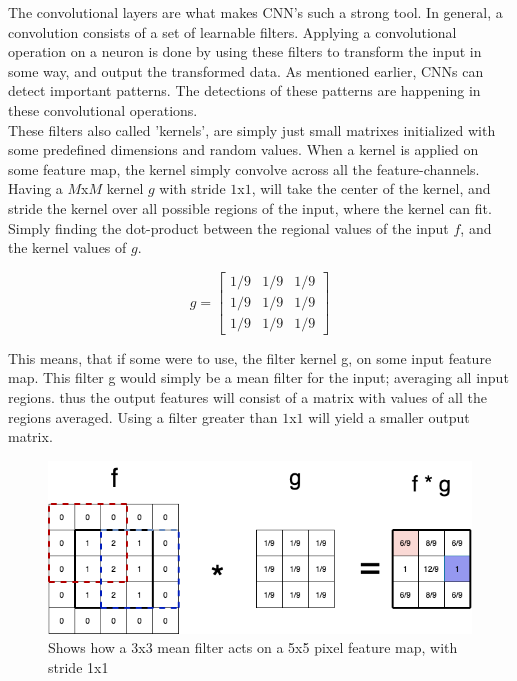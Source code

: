The convolutional layers are what makes CNN's such a strong tool. In general, a convolution consists of a set of learnable filters. Applying a convolutional operation on a neuron is done by using these filters to transform the input in some way, and output the transformed data. As mentioned earlier, CNNs can detect important patterns. The detections of these patterns are happening in these convolutional operations.\\

\noindent
These filters also called 'kernels', are simply just small matrixes initialized with some predefined dimensions and random values. When a kernel is applied on some feature map, the kernel simply convolve across all the feature-channels.\\

\noindent
Having a $M$x$M$ kernel $g$ with stride $1$x$1$, will take the center of the kernel, and stride the kernel over all possible regions of the input, where the kernel can fit. Simply finding the dot-product between the regional values of the input $f$, and the kernel values of $g$.

$$ g = \begin{bmatrix}
1/9 & 1/9 & 1/9 \\
1/9 & 1/9 & 1/9 \\
1/9 & 1/9 & 1/9
\end{bmatrix}
$$

\noindent
This means, that if some were to use, the filter kernel g, on some input feature map. This filter g would simply be a mean filter for the input; averaging all input regions. thus the output features will consist of a matrix with values of all the regions averaged. Using a filter greater than $1$x$1$ will yield a smaller output matrix.

\begin{figure}[!ht]
  \centering
  \includegraphics[scale=0.4]{latex/imgs/conv1.png}
  \caption{Shows how a 3x3 mean filter acts on a 5x5 pixel feature map, with stride 1x1}\label{Baseline:before}
\end{figure}

